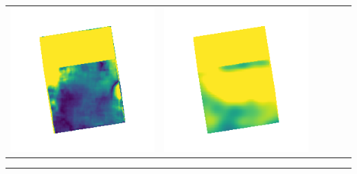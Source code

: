 \begin{tabularx}{\linewidth}{@{}Y@{}Y@{}Y@{}Y@{}Y@{}Y@{}}
\includegraphics[width=\linewidth]{semisynthetic/20160617_0_marrnet_err.png} &
\includegraphics[width=\linewidth]{semisynthetic/20160617_0_ef_err.png} \\
\end{tabularx}
\begin{center}\rule{0.5\linewidth}{\linethickness}\end{center}

